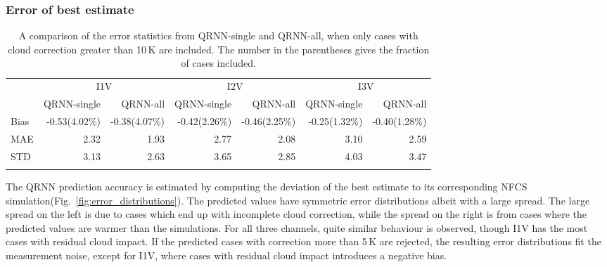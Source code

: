 \documentclass[amt, manuscript]{copernicus}
\begin{document}
\subsubsection{Error of best estimate}  
%
\begin{table}[t]
	\caption{A comparison of the error statistics from QRNN-single and QRNN-all, when only cases with cloud correction greater than 10\,K are included. The number in the parentheses gives the fraction of cases included.}
	\label{tab:error_statistics_ici_high_cloud_impact}
	\begin{tabular}{lrr|rr|rr}
		\tophline
		&\multicolumn{2}{c|}{I1V}& \multicolumn{2}{c|}{I2V} & \multicolumn{2}{c}{I3V}\\
		\cline{2-7}
		&QRNN-single& QRNN-all & QRNN-single & QRNN-all  & QRNN-single & QRNN-all\\
		\middlehline
		Bias     & -0.53(4.02\%) & -0.38(4.07\%)  & -0.42(2.26\%) & -0.46(2.25\%) & -0.25(1.32\%) & -0.40(1.28\%) \\
		MAE      &  2.32 &  1.93  &  2.77 &  2.08 &  3.10 &  2.59 \\
		STD      &  3.13 &  2.63  &  3.65 &  2.85 &  4.03 &  3.47 \\
		\bottomhline
	\end{tabular}
	\belowtable{} %
\end{table}

The QRNN prediction accuracy is estimated by computing the deviation of the best estimate to its corresponding NFCS simulation(Fig.~\ref{fig:error_distributions}). The predicted values have symmetric error distributions albeit with a large spread. The large spread on the left is due to cases which end up with incomplete cloud correction, while the spread on the right is from cases where the predicted values are warmer than the simulations. For all three channels, quite similar behaviour is observed, though I1V has the most cases with residual cloud impact. If the predicted cases with correction more than 5\,K are rejected, the resulting error distributions fit the measurement noise, except for I1V, where cases with residual cloud impact introduces a negative bias. 
\end{document}
